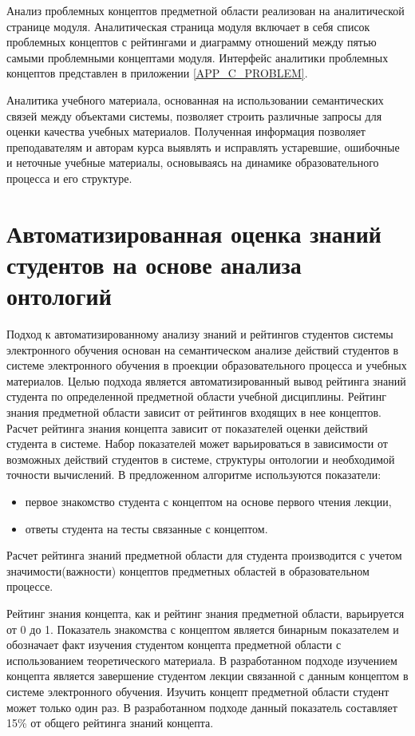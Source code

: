 Анализ проблемных концептов предметной области реализован на аналитической странице модуля. Аналитическая страница модуля включает в себя список проблемных концептов с рейтингами и диаграмму отношений между пятью самыми проблемными концептами модуля. Интерфейс аналитики проблемных концептов представлен в приложении  \ref{APP_C_PROBLEM}.

Аналитика учебного материала, основанная на использовании семантических связей между объектами системы, позволяет строить различные запросы для оценки качества учебных материалов. Полученная информация позволяет преподавателям и авторам курса выявлять и исправлять устаревшие, ошибочные и неточные учебные материалы, основываясь на динамике образовательного процесса и его структуре.



\section{Автоматизированная оценка знаний студентов на основе анализа онтологий} \label{sect3_5}

Подход к автоматизированному анализу знаний и рейтингов студентов системы электронного обучения основан на семантическом анализе действий студентов в системе электронного обучения в проекции образовательного процесса и учебных материалов. Целью подхода является автоматизированный вывод рейтинга знаний студента по определенной предметной области учебной дисциплины. Рейтинг знания предметной области зависит от рейтингов входящих в нее концептов. Расчет рейтинга знания концепта зависит от показателей оценки действий студента в системе. Набор показателей может варьироваться в зависимости от возможных действий студентов в системе, структуры онтологии и необходимой точности вычислений. В предложенном алгоритме  используются показатели: 

\begin{itemize}
\item первое знакомство студента с концептом на основе первого чтения лекции,
\item ответы студента на тесты связанные с концептом. 
\end{itemize}

Расчет рейтинга знаний предметной области для студента  производится с учетом значимости(важности) концептов предметных областей в образовательном процессе.

Рейтинг знания концепта, как и рейтинг знания предметной области, варьируется от 0 до 1. Показатель знакомства с концептом является бинарным показателем и обозначает факт изучения студентом концепта предметной области с использованием теоретического материала. В разработанном подходе изучением концепта является завершение студентом лекции связанной с данным концептом в системе электронного обучения. Изучить концепт предметной области студент может только один раз. В разработанном подходе данный показатель составляет 15\% от общего рейтинга знаний концепта.

